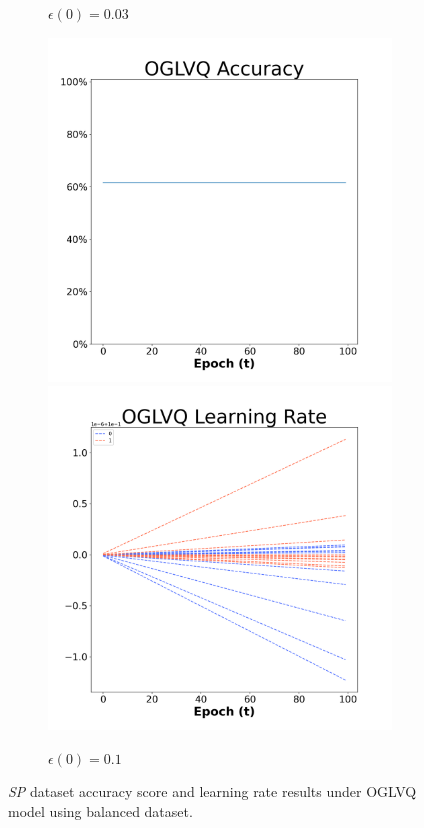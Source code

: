 \begin{figure}[H]
\begin{subfigure}{0.3\textwidth}
  \caption{$\epsilon(0)=0.03$}
\end{subfigure}\hfil %
\begin{subfigure}{0.3\textwidth}
  \includegraphics[width=\linewidth]{images/exper1/SP/OGLVQ_0.1_acc.png}
  \includegraphics[width=\linewidth]{images/exper1/SP/OGLVQ_0.1_lr.png}
  \caption{$\epsilon(0)=0.1$}
\end{subfigure}

\caption{\textit{SP} dataset accuracy score and learning rate results under OGLVQ model using balanced dataset.}
\end{figure}





